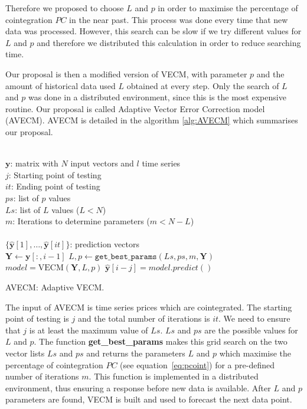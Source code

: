 Therefore we proposed to choose $L$ and $p$ in order to maximise the percentage
of cointegration $PC$ in the near past. This process was done every time that
new data was processed. However, this search can be slow if we try different
values for $L$ and $p$ and therefore we distributed this calculation in order to
reduce searching time.

Our proposal is then a modified version of VECM, with parameter $p$ and the
amount of historical data used $L$ obtained at every step. Only the search of
$L$ and $p$ was done in a distributed environment, since this is the most
expensive routine. Our proposal is called Adaptive Vector Error Correction model
(AVECM). AVECM is detailed in the algorithm \ref{alg:AVECM} which summarises
our proposal.

\begin{algorithm}[ht!]
\begin{algorithmic}[1]
\REQUIRE $\,$ \\
$\mathbf{y}$: matrix with $N$ input vectors and $l$ time series\\
$j$: Starting point of testing \\
$it$: Ending point of testing \\
$ps$: list of $p$ values \\
$Ls$: list of $L$ values ($L<N$) \\
$m$: Iterations to determine parameters ($m < N-L$)\\
\ENSURE  $\,$ \\
$\{ \hat{\mathbf{y}}[1],\dots,\hat{\mathbf{y}}[it]\}$: prediction vectors \\
   \STATE $\mathbf{Y} \gets \mathbf{y}[:,i-1]$
    \STATE $L,p \gets
    \texttt{get\_best\_params}(Ls,ps,m,\mathbf{Y})$
        \STATE $model = \text{VECM}(\mathbf{Y},L, p)$
        \STATE $\hat{\mathbf{y}}[i-j] = model.predict()$
\ENDFOR
\end{algorithmic}
\caption{AVECM: Adaptive VECM.}
\label{alg:AVECM}
\end{algorithm}

The input of AVECM is time series prices which are cointegrated. The starting
point of testing is $j$ and the total number of iterations is $it$. We need to
ensure that $j$ is at least the maximum value of $Ls$. $Ls$ and $ps$ are the
possible values for $L$ and $p$.  The function {\bf get\_best\_params} makes
this grid search on the two vector lists $Ls$ and $ps$ and returns the
parameters $L$ and $p$ which maximise the percentage of cointegration $PC$ (see
equation~\ref{eq:pcoint}) for a pre-defined number of iterations $m$. This
function is implemented in a distributed environment, thus ensuring a response
before new data is available.  After $L$ and $p$ parameters are found, VECM is
built and used to forecast the next data point.


